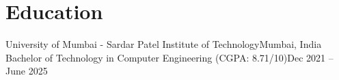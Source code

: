 \section{Education}
\resumeSubHeadingListStart
\resumeSubheading
{University of Mumbai - Sardar Patel Institute of Technology}{Mumbai, India}
{Bachelor of Technology in Computer Engineering (CGPA: 8.71/10)}{Dec 2021 -- June 2025}{}
\resumeSubHeadingListEnd
